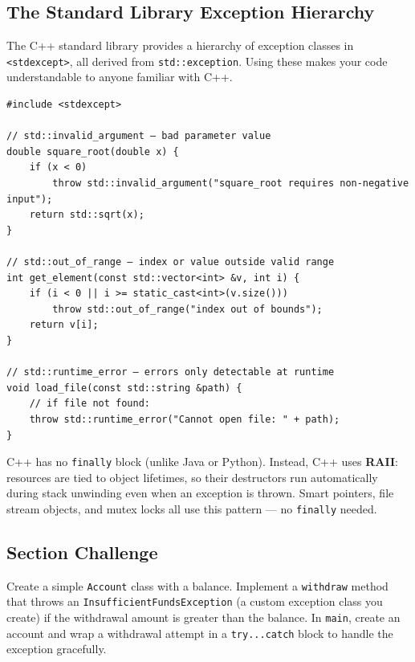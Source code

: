 \subsection{The Standard Library Exception Hierarchy}
The C++ standard library provides a hierarchy of exception classes in \texttt{<stdexcept>}, all derived from \texttt{std::exception}. Using these makes your code understandable to anyone familiar with C++.

\begin{lstlisting}
#include <stdexcept>

// std::invalid_argument — bad parameter value
double square_root(double x) {
	if (x < 0)
		throw std::invalid_argument("square_root requires non-negative input");
	return std::sqrt(x);
}

// std::out_of_range — index or value outside valid range
int get_element(const std::vector<int> &v, int i) {
	if (i < 0 || i >= static_cast<int>(v.size()))
		throw std::out_of_range("index out of bounds");
	return v[i];
}

// std::runtime_error — errors only detectable at runtime
void load_file(const std::string &path) {
	// if file not found:
	throw std::runtime_error("Cannot open file: " + path);
}
\end{lstlisting}

\begin{remark}
	C++ has no \texttt{finally} block (unlike Java or Python). Instead, C++ uses \textbf{RAII}: resources are tied to object lifetimes, so their destructors run automatically during stack unwinding even when an exception is thrown. Smart pointers, file stream objects, and mutex locks all use this pattern — no \texttt{finally} needed.
\end{remark}

\subsection{Section Challenge}
Create a simple \texttt{Account} class with a balance. Implement a \texttt{withdraw} method that throws an \texttt{InsufficientFundsException} (a custom exception class you create) if the withdrawal amount is greater than the balance. In \texttt{main}, create an account and wrap a withdrawal attempt in a \texttt{try...catch} block to handle the exception gracefully.

